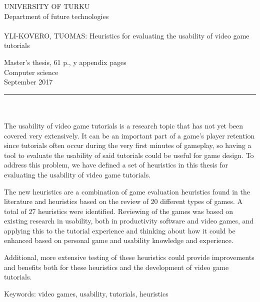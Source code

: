 \documentclass[12pt, a4paper]{report}
\begin{document}
\begin{minipage}{15cm}
	\pagestyle{empty}
	\noindent
	UNIVERSITY OF TURKU\\
	Department of future technologies\\
	\\
	YLI-KOVERO, TUOMAS: Heuristics for evaluating the usability of video game tutorials
	
	Master's thesis, 61 p., y appendix pages\\
	Computer science\\
	September 2017\\
	\rule{\textwidth}{.2mm}\\
	\\
	The usability of video game tutorials is a research topic that has not yet been covered very extensively. It can be an important part of a game's player retention since tutorials often occur during the very first minutes of gameplay, so having a tool to evaluate the usability of said tutorials could be useful for game design. To address this problem, we have defined a set of heuristics in this thesis for evaluating the usability of video game tutorials.
	
	\vspace{4mm}\noindent The new heuristics are a combination of game evaluation heuristics found in the literature and heuristics based on the review of 20 different types of games. A total of 27 heuristics were identified. Reviewing of the games was based on existing research in usability, both in productivity software and video games, and applying this to the tutorial experience and thinking about how it could be enhanced based on personal game and usability knowledge and experience.
	
	\vspace{4mm}\noindent Additional, more extensive testing of these heuristics could provide improvements and benefits both for these heuristics and the development of video game tutorials. 
	
	\vspace{4mm}\noindent Keywords: video games, usability, tutorials, heuristics
	
\end{minipage}
\end{document}
